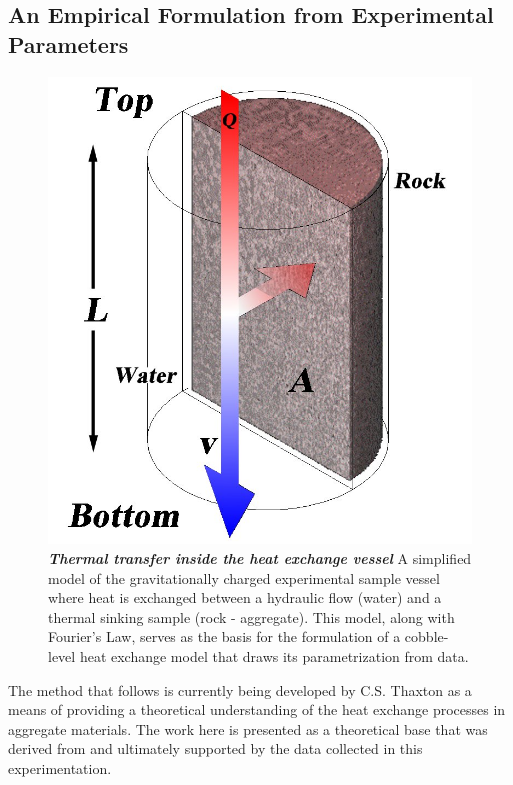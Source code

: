 \subsection{An Empirical Formulation from Experimental Parameters}

\begin{figure}
\begin{center}
\includegraphics[scale=.25]{theorySlab.jpg}
\caption[Thermal Transfer Model]{\textbf{\emph{Thermal transfer inside the heat exchange vessel}} A simplified model of the gravitationally charged experimental sample vessel where heat is exchanged between a hydraulic flow (water) and a thermal sinking sample (rock - aggregate). This model, along with Fourier's Law, serves as the basis for the formulation of a cobble-level heat exchange model that draws its parametrization from data.\label{slab}}
\end{center}
\end{figure}

The method that follows is currently being developed by C.S. Thaxton as a means of providing a theoretical understanding of the heat exchange processes in aggregate materials. The work here is presented as a theoretical base that was derived from and ultimately supported by the data collected in this experimentation.

